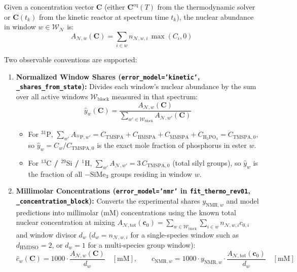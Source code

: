 \documentclass[11pt,a4paper]{article}
\begin{document}
Given a concentration vector $\mathbf{C}$ (either $\mathbf{C}^{\text{eq}}(T)$ from the thermodynamic solver or $\mathbf{C}(t_k)$ from the kinetic reactor at spectrum time $t_k$), the nuclear abundance in window $w \in \mathcal{W}_{\mathcal{N}}$ is:
\begin{equation}
A_{\mathcal{N}, w}(\mathbf{C}) = \sum_{i \in w} n_{\mathcal{N}, w, i} \, \max(C_i, 0)
\end{equation}

Two observable conventions are supported:

\begin{enumerate}[leftmargin=1.8em]
    \item \textbf{Normalized Window Shares (\texttt{error\_\allowbreak{}model='kinetic'}, \texttt{\_\allowbreak{}shares\_\allowbreak{}from\_\allowbreak{}state}):}
    Divides each window's nuclear abundance by the sum over all active windows $\mathcal{W}_{\text{block}}$ measured in that spectrum:
    \begin{equation}
    \hat{y}_{w}(\mathbf{C}) = \frac{A_{\mathcal{N}, w}(\mathbf{C})}{\sum_{w' \in \mathcal{W}_{\text{block}}} A_{\mathcal{N}, w'}(\mathbf{C})}
    \end{equation}
    \begin{itemize}[leftmargin=1.5em]
        \item For \textbf{$^{31}\text{P}$}, $\sum_{w'} A_{{}^{31}\text{P}, w'} = C_{\text{TMSPA}} + C_{\text{BMSPA}} + C_{\text{MMSPA}} + C_{\text{H}_3\text{PO}_4} = C_{\text{TMSPA}, 0}$, so $\hat{y}_w = C_w / C_{\text{TMSPA}, 0}$ is the exact mole fraction of phosphorus in ester $w$.
        \item For \textbf{$^{13}\text{C}$ / $^{29}\text{Si}$ / $^1\text{H}$}, $\sum_{w'} A_{\mathcal{N}, w'} = 3\,C_{\text{TMSPA}, 0}$ (total silyl groups), so $\hat{y}_w$ is the fraction of all $-\text{SiMe}_3$ groups residing in window $w$.
    \end{itemize}

    \item \textbf{Millimolar Concentrations (\texttt{error\_\allowbreak{}model='nmr'} in \texttt{fit\_\allowbreak{}thermo\_\allowbreak{}rev01}, \texttt{\_\allowbreak{}concentration\_\allowbreak{}block}):}
    Converts the experimental shares $y_{\text{NMR}, w}$ and model predictions into millimolar ($\text{mM}$) concentrations using the known total nuclear concentration at mixing $A_{\mathcal{N}, \text{tot}}(\mathbf{c}_0) = \sum_{w \in \mathcal{W}_{\text{block}}} \sum_{i \in w} n_{\mathcal{N}, w, i} c_{0, i}$ and window divisor $d_w$ ($d_w = n_{\mathcal{N}, w, i}$ for a single-species window such as $d_{\text{HMDSO}} = 2$, or $d_w = 1$ for a multi-species group window):
    \begin{equation}
    \hat{c}_w(\mathbf{C}) = 1000 \cdot \frac{A_{\mathcal{N}, w}(\mathbf{C})}{d_w} \quad [\text{mM}], \qquad c_{\text{NMR}, w} = 1000 \cdot y_{\text{NMR}, w} \cdot \frac{A_{\mathcal{N}, \text{tot}}(\mathbf{c}_0)}{d_w} \quad [\text{mM}]
    \end{equation}
\end{enumerate}
\end{document}
